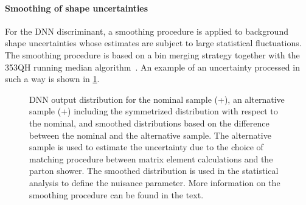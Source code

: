 \paragraph{Smoothing of shape uncertainties}
For the DNN discriminant, a smoothing procedure is applied to background shape uncertainties whose estimates are subject to large statistical fluctuations. 
The smoothing procedure is based on a bin merging strategy together with the 353QH running median algorithm~\cite{Friedman353QH}. 
An example of an uncertainty processed in such a way is shown in \cref{fig:dnn:smoothing}.
\begin{figure}[th]
    \centering
    {\caption{DNN output distribution for the nominal \ttbar sample (\Powheg+\PYTHIA[8]), an alternative sample (\aMCATNLO+\PYTHIA[8]) including the symmetrized distribution with respect to the nominal, and smoothed distributions based on the difference between the nominal and the alternative sample. The alternative sample is used to estimate the uncertainty due to the choice of matching procedure between matrix element calculations and the parton shower. The smoothed distribution is used in the statistical analysis to define the nuisance parameter. More information on the smoothing procedure can be found in the text.
    \label{fig:dnn:smoothing} }}
\end{figure}

